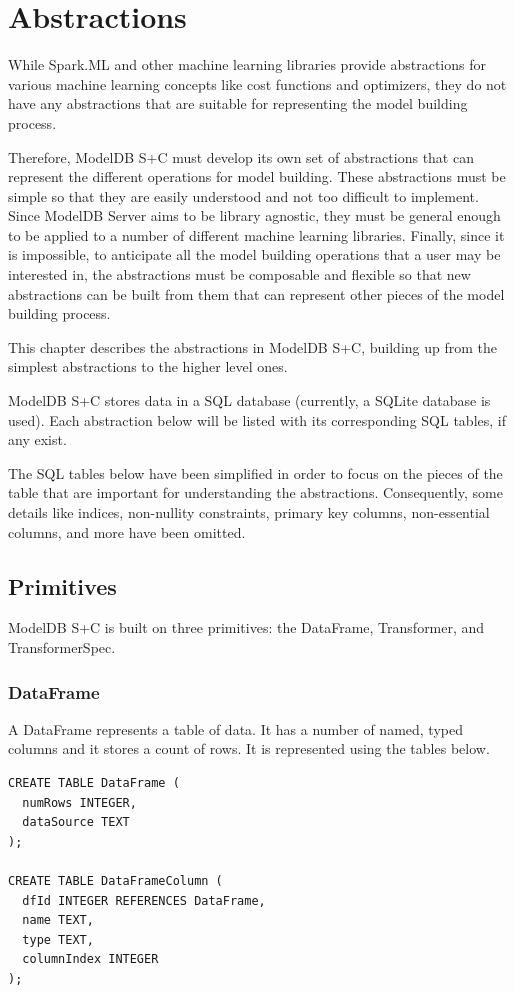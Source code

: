 \chapter{Abstractions}
While Spark.ML and other machine learning libraries provide abstractions for various machine
learning concepts like cost functions and optimizers, they do not have any abstractions
that are suitable for representing the model building process.

Therefore, ModelDB S+C must develop its own set of abstractions that can represent
the different operations for model building. These abstractions must be simple so
that they are easily understood and not too difficult to implement. Since ModelDB
Server aims to be library agnostic, they must be general enough to be applied to
a number of different machine learning libraries. Finally, since it is impossible,
to anticipate all the model building operations that a user may be interested in,
the abstractions must be composable and flexible so that new abstractions can be built 
from them that can represent other pieces of the model building process.

This chapter describes the abstractions in ModelDB S+C, building up from the
simplest abstractions to the higher level ones.

ModelDB S+C stores data in a SQL database (currently, a SQLite database is
used). Each abstraction below will be listed with its corresponding SQL 
tables, if any exist. 

The SQL tables below have been simplified in order to focus on the pieces 
of the table that are important for understanding the abstractions. Consequently,
some details like indices, non-nullity constraints, primary key columns, 
non-essential columns, and more have been omitted.


\section{Primitives}
ModelDB S+C is built on three primitives: the DataFrame, Transformer, and 
TransformerSpec.

\subsection{DataFrame}

A DataFrame represents a table of data. It has a number of named, typed columns
and it stores a count of rows. It is represented using the tables below.

\begin{verbatim}
CREATE TABLE DataFrame (
  numRows INTEGER,
  dataSource TEXT
);

CREATE TABLE DataFrameColumn (
  dfId INTEGER REFERENCES DataFrame,
  name TEXT,
  type TEXT,
  columnIndex INTEGER
);
\end{verbatim}

